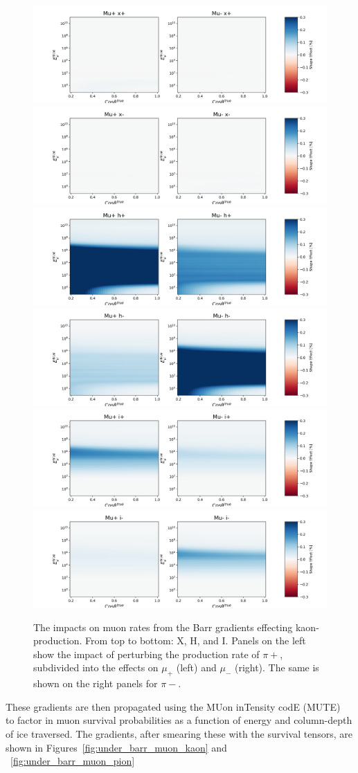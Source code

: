 \documentclass[main.tex]{subfiles}
\begin{document}
\begin{figure}
    \centering
    \includegraphics[width=0.45\linewidth]{./figures/muon/muon_barr_x+.png}%
    \includegraphics[width=0.45\linewidth]{./figures/muon/muon_barr_x-.png}
    \includegraphics[width=0.45\linewidth]{./figures/muon/muon_barr_h+.png}%
    \includegraphics[width=0.45\linewidth]{./figures/muon/muon_barr_h-.png}
    \includegraphics[width=0.45\linewidth]{./figures/muon/muon_barr_i+.png}%
    \includegraphics[width=0.45\linewidth]{./figures/muon/muon_barr_i-.png}
    \caption{The impacts on muon rates from the Barr gradients effecting kaon-production. From top to bottom: X, H, and I. Panels on the left show the impact of perturbing the production rate of $\pi+$, subdivided into the effects on $\mu_{+}$ (left) and $\mu_{-}$ (right). The same is shown on the right panels for $\pi-$.}\label{fig:barr_muon_pion}
\end{figure}

These gradients are then propagated using the MUon inTensity codE (MUTE)~\cite{Fedynitch:2021ima} to factor in muon survival probabilities as a function of energy and column-depth of ice traversed. 
The gradients, after smearing these with the survival tensors, are shown in Figures~\ref{fig:under_barr_muon_kaon} and ~\ref{fig:under_barr_muon_pion}
\end{document}
